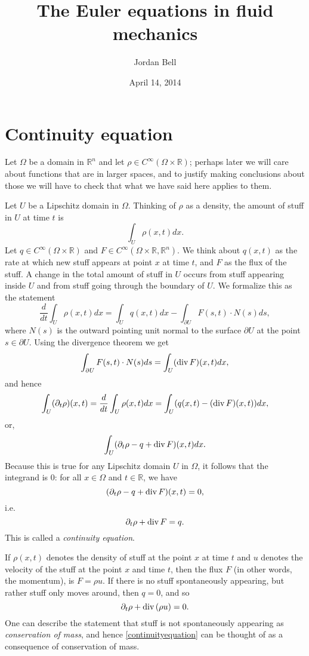 \documentclass{article}
\renewcommand{\div}{\ensuremath\mathrm{div}\,}
\theoremstyle{definition}
\begin{document}
\title{The Euler equations in fluid mechanics}
\author{Jordan Bell}
\date{April 14, 2014}

\maketitle

\section{Continuity equation}
Let $\Omega$ be a domain in $\mathbb{R}^n$ and let $\rho \in C^\infty(\Omega \times \mathbb{R})$; perhaps later we will
care about functions  that are in larger spaces, and to justify making conclusions about those we will
have to check that what we have said here applies to them. 

Let $U$ be a Lipschitz domain in $\Omega$. Thinking of $\rho$ as a density, the amount of stuff in $U$ at time $t$
is 
\[
\int_U \rho(x,t) dx.
\]
Let $q \in C^\infty(\Omega \times \mathbb{R})$ and $F \in C^\infty(\Omega \times \mathbb{R}, \mathbb{R}^n)$. 
We think about  $q(x,t)$ as the rate at which new stuff appears at point $x$
at time $t$, and $F$ as the flux  of the stuff.
A change in the total amount of stuff in $U$ occurs from stuff appearing inside $U$ and from stuff going through the boundary
of $U$. We formalize this as the statement
\[
\frac{d}{dt}\int_U \rho(x,t)dx = \int_U q(x,t) dx - \int_{\partial U} F(s,t) \cdot N(s) ds,
\]
where $N(s)$ is the outward pointing unit normal to the surface $\partial U$ at the point $s \in \partial U$. 
Using the divergence theorem we get
\[
\int_{\partial U} F(s,t) \cdot N(s) ds = \int_U (\div F)(x,t) dx,
\]
and hence
\[
\int_U (\partial_t \rho)(x,t) = \frac{d}{dt} \int_U \rho(x,t)dx = \int_U (q(x,t) - (\div F)(x,t)) dx,
\]
or,
\[
\int_U (\partial_t \rho - q + \div F)(x,t) dx.
\]
Because this is true for any Lipschitz domain $U$ in $\Omega$, it follows that the integrand is $0$: for all $x \in \Omega$ and $t \in \mathbb{R}$, we have
\[
(\partial_t \rho - q + \div F)(x,t) = 0,
\]
i.e.
\[
\partial_t \rho + \div F = q.
\]
This is called a {\em continuity equation}.

If $\rho(x,t)$ denotes the density of stuff at the point $x$ at time $t$ and $u$ denotes the velocity of the stuff at the point $x$
and time $t$, then the flux $F$ (in other words, the  momentum), is $F=\rho u$. If there is no stuff spontaneously appearing, but rather stuff only moves around,
then $q=0$, and so
\begin{equation}
\partial_t \rho + \div(\rho u) = 0.
\label{continuityequation}
\end{equation}
One can describe the statement that stuff is not spontaneously appearing as {\em conservation of mass}, and hence \eqref{continuityequation}
 can be thought of as a consequence of conservation of mass.
\end{document}
